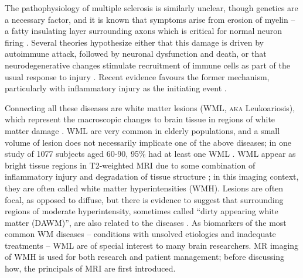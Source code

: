 \par
The pathophysiology of multiple sclerosis is similarly unclear, though genetics are a necessary factor, and it is known that symptoms arise from erosion of myelin -- a fatty insulating layer surrounding axons which is critical for normal neuron firing \cite{Trapp2008}. Several theories hypothesize either that this damage is driven by autoimmune attack, followed by neuronal dysfunction and death, or that neurodegenerative changes stimulate recruitment of immune cells as part of the usual response to injury \cite{Lucchinetti2000,Trapp2008}. Recent evidence favours the former mechanism, particularly with inflammatory injury as the initiating event \cite{Ciccarelli2014,Mahad2015}.
\par
Connecting all these diseases are white matter lesions (WML, \textsc{aka} Leukoariosis), which represent the macroscopic changes to brain tissue in regions of white matter damage \cite{Debette2010,Bakshi2005,Wardlaw2015}. WML are very common in elderly populations, and a small volume of lesion does not necessarily implicate one of the above diseases; in one study of 1077 subjects aged 60-90, 95\% had at least one WML \cite{DeLeeuw2001}. WML appear as bright tissue regions in T2-weighted MRI due to some combination of inflammatory injury and degradation of tissue structure \cite{Bakshi2005,Wardlaw2015}; in this imaging context, they are often called white matter hyperintensities (WMH). Lesions are often focal, as opposed to diffuse, but there is evidence to suggest that surrounding regions of moderate hyperintensity, sometimes called ``dirty appearing white matter (DAWM)'', are also related to the diseases \cite{Ge2003}. As biomarkers of the most common WM diseases -- conditions with unsolved etiologies and inadequate treatments -- WML are of special interest to many brain researchers. MR imaging of WMH is used for both research and patient management; before discussing how, the principals of MRI are first introduced.
